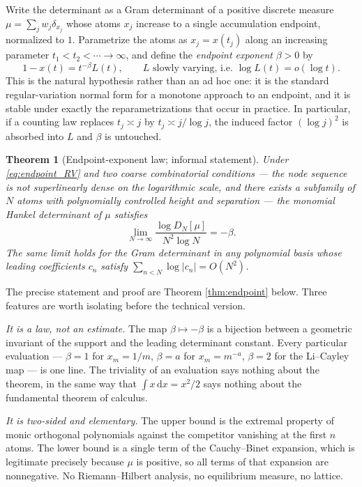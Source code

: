 \documentclass[11pt]{amsart}
\numberwithin{equation}{section}
\theoremstyle{plain}
\newtheorem{theorem}{Theorem}[section]
\theoremstyle{definition}
\theoremstyle{remark}
\newcommand{\dd}{\,\mathrm d}
\begin{document}
Write the determinant as a Gram determinant of a positive discrete measure
$\mu=\sum_{j}w_{j}\delta_{x_{j}}$ whose atoms $x_{j}$ increase to a single accumulation endpoint,
normalized to $1$. Parametrize the atoms as $x_{j}=x(t_{j})$ along an increasing parameter
$t_{1}<t_{2}<\cdots\to\infty$, and define the \emph{endpoint exponent} $\beta>0$ by
\begin{equation}
1-x(t)=t^{-\beta}L(t),\qquad L \text{ slowly varying, i.e. } \log L(t)=o(\log t).
\label{eq:endpoint_RV}
\end{equation}
This is the natural hypothesis rather than an ad hoc one: it is the standard regular-variation
normal form for a monotone approach to an endpoint, and it is stable under exactly the
reparametrizations that occur in practice. In particular, if a counting law replaces $t_{j}\asymp j$
by $t_{j}\asymp j/\log j$, the induced factor $(\log j)^{2}$ is absorbed into $L$ and $\beta$ is
untouched.

\begin{theorem}[Endpoint-exponent law; informal statement]
Under \eqref{eq:endpoint_RV} and two coarse combinatorial conditions --- the node sequence is not
superlinearly dense on the logarithmic scale, and there exists a subfamily of $N$ atoms with
polynomially controlled height and separation --- the monomial Hankel determinant of $\mu$ satisfies
\[
\lim_{N\to\infty}\frac{\log D_{N}[\mu]}{N^{2}\log N}=-\beta .
\]
The same limit holds for the Gram determinant in any polynomial basis whose leading coefficients
$c_{n}$ satisfy $\sum_{n<N}\log|c_{n}|=O(N^{2})$.
\end{theorem}

The precise statement and proof are Theorem \ref{thm:endpoint} below. Three features are worth
isolating before the technical version.

\emph{It is a law, not an estimate.} The map $\beta\mapsto-\beta$ is a bijection between a geometric
invariant of the support and the leading determinant constant. Every particular evaluation
--- $\beta=1$ for $x_{m}=1/m$, $\beta=a$ for $x_{m}=m^{-a}$, $\beta=2$ for the Li--Cayley map --- is one
line. The triviality of an evaluation says nothing about the theorem, in the same way that
$\int x\dd x=x^{2}/2$ says nothing about the fundamental theorem of calculus.

\emph{It is two-sided and elementary.} The upper bound is the extremal property of monic orthogonal
polynomials against the competitor vanishing at the first $n$ atoms. The lower bound is a single
term of the Cauchy--Binet expansion, which is legitimate precisely because $\mu$ is positive, so all
terms of that expansion are nonnegative. No Riemann--Hilbert analysis, no equilibrium measure, no
lattice.
\end{document}
